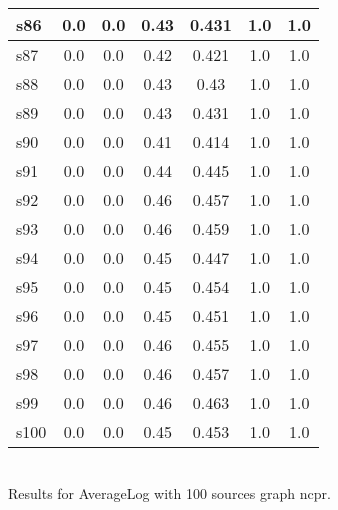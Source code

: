 \documentclass{article}
\begin{document}
\begin{tabular}{|l|c|c|c|c|c|c|}
\hline
s86 &0.0 & 0.0 & 0.43 & 0.431 & 1.0 & 1.0\\
\hline
s87 &0.0 & 0.0 & 0.42 & 0.421 & 1.0 & 1.0\\
\hline
s88 &0.0 & 0.0 & 0.43 & 0.43 & 1.0 & 1.0\\
\hline
s89 &0.0 & 0.0 & 0.43 & 0.431 & 1.0 & 1.0\\
\hline
s90 &0.0 & 0.0 & 0.41 & 0.414 & 1.0 & 1.0\\
\hline
s91 &0.0 & 0.0 & 0.44 & 0.445 & 1.0 & 1.0\\
\hline
s92 &0.0 & 0.0 & 0.46 & 0.457 & 1.0 & 1.0\\
\hline
s93 &0.0 & 0.0 & 0.46 & 0.459 & 1.0 & 1.0\\
\hline
s94 &0.0 & 0.0 & 0.45 & 0.447 & 1.0 & 1.0\\
\hline
s95 &0.0 & 0.0 & 0.45 & 0.454 & 1.0 & 1.0\\
\hline
s96 &0.0 & 0.0 & 0.45 & 0.451 & 1.0 & 1.0\\
\hline
s97 &0.0 & 0.0 & 0.46 & 0.455 & 1.0 & 1.0\\
\hline
s98 &0.0 & 0.0 & 0.46 & 0.457 & 1.0 & 1.0\\
\hline
s99 &0.0 & 0.0 & 0.46 & 0.463 & 1.0 & 1.0\\
\hline
s100 &0.0 & 0.0 & 0.45 & 0.453 & 1.0 & 1.0\\
\hline
\end{tabular}\\

\noindent Results for AverageLog with 100 sources graph ncpr.
\end{document}
